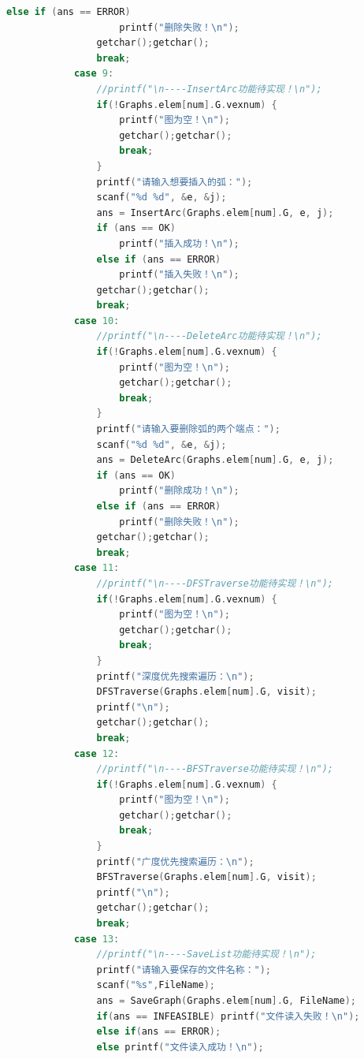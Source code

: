 \documentclass[supercite]{Experimental_Report}
\theoremstyle{definition}
\begin{document}
\begin{lstlisting}[language=c]
	            else if (ans == ERROR)
	                printf("删除失败！\n");
                getchar();getchar();
                break;
            case 9:
                //printf("\n----InsertArc功能待实现！\n");
                if(!Graphs.elem[num].G.vexnum) {
                    printf("图为空！\n");
                    getchar();getchar();
                    break;
                }
                printf("请输入想要插入的弧：");
	            scanf("%d %d", &e, &j);
				ans = InsertArc(Graphs.elem[num].G, e, j);
	            if (ans == OK)
	                printf("插入成功！\n");
	            else if (ans == ERROR)
	                printf("插入失败！\n");
                getchar();getchar();
                break;
            case 10:
                //printf("\n----DeleteArc功能待实现！\n");
                if(!Graphs.elem[num].G.vexnum) {
                    printf("图为空！\n");
                    getchar();getchar();
                    break;
                }
                printf("请输入要删除弧的两个端点："); 
                scanf("%d %d", &e, &j);
	            ans = DeleteArc(Graphs.elem[num].G, e, j);
	            if (ans == OK)
	                printf("删除成功！\n");
	            else if (ans == ERROR)
	                printf("删除失败！\n");
                getchar();getchar();
                break;
            case 11:
                //printf("\n----DFSTraverse功能待实现！\n");
                if(!Graphs.elem[num].G.vexnum) {
                    printf("图为空！\n");
                    getchar();getchar();
                    break;
                }
                printf("深度优先搜索遍历：\n");
	            DFSTraverse(Graphs.elem[num].G, visit);
	            printf("\n");
                getchar();getchar();
                break;
            case 12:
                //printf("\n----BFSTraverse功能待实现！\n");
                if(!Graphs.elem[num].G.vexnum) {
                    printf("图为空！\n");
                    getchar();getchar();
                    break;
                }
                printf("广度优先搜索遍历：\n");
	            BFSTraverse(Graphs.elem[num].G, visit);
	            printf("\n");
                getchar();getchar();
                break;
            case 13:
                //printf("\n----SaveList功能待实现！\n");
                printf("请输入要保存的文件名称：");
                scanf("%s",FileName);
                ans = SaveGraph(Graphs.elem[num].G, FileName);
                if(ans == INFEASIBLE) printf("文件读入失败！\n");
                else if(ans == ERROR);
                else printf("文件读入成功！\n");

\end{lstlisting}
\end{document}
